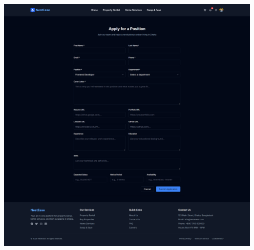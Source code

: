 \documentclass[conference]{IEEEtran}
\begin{document}
\begin{center}
\noindent
\begin{minipage}[t]{0.45\textwidth}
\includegraphics[width=\linewidth]{Project Screenshot/Apply Now Job.png}
\end{minipage} \hfill
\begin{minipage}[t]{0.45\textwidth}

\end{minipage}
\end{center}
\end{document}
